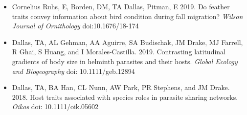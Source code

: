 \documentclass[]{CV}
\begin{document}
\begin{itemize}
  \item Cornelius Ruhs, E, Borden, DM, {\mefont TA Dallas}, Pitman, E 2019. Do feather traits convey information about bird condition during fall migration? \textit{Wilson Journal of Ornithology} doi:10.1676/18-174

  \item {\mefont Dallas, TA}, AL Gehman, AA Aguirre, SA Budischak, JM Drake, MJ Farrell, R Ghai, S Huang, and I Morales-Castilla. 2019. Contrasting latitudinal gradients of body size in helminth parasites and their hosts. \textit{Global Ecology and Biogeography} doi: 10.1111/geb.12894

\item {\mefont Dallas, TA}, BA Han, CL Nunn, AW Park, PR Stephens, and JM Drake. 2018. Host traits associated with species roles in parasite sharing networks. \textit{Oikos} doi: 10.1111/oik.05602
 
\end{itemize}
\end{document}
